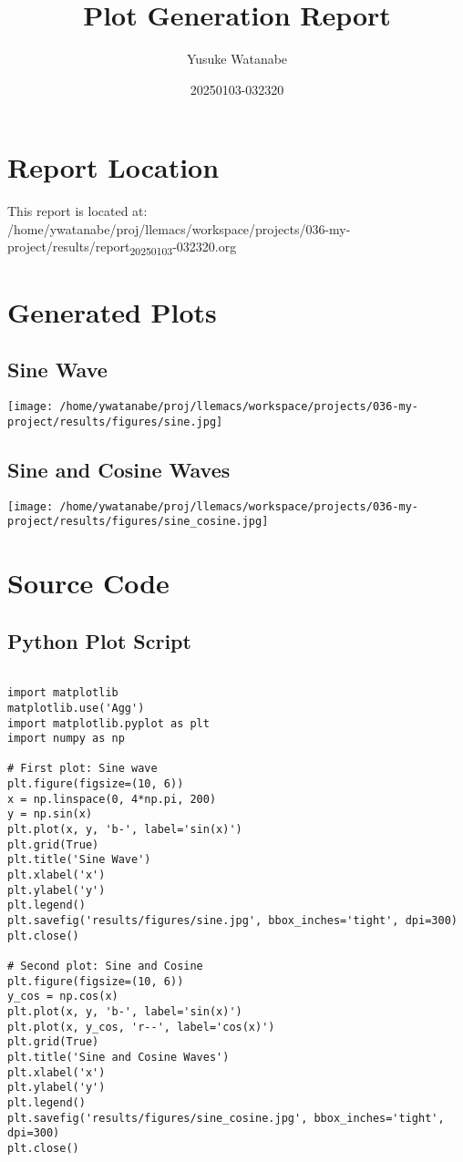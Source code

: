\documentclass[11pt]{article}
\author{Yusuke Watanabe}
\date{20250103-032320}
\title{Plot Generation Report}
\begin{document}
\maketitle
\tableofcontents


\section{Report Location}
\label{sec:orgd93d32f}
This report is located at: /home/ywatanabe/proj/llemacs/workspace/projects/036-my-project/results/report\textsubscript{20250103}-032320.org

\section{Generated Plots}
\label{sec:orgd9be403}

\subsection{Sine Wave}
\label{sec:org0f83f1f}
\begin{center}
\texttt{[image: /home/ywatanabe/proj/llemacs/workspace/projects/036-my-project/results/figures/sine.jpg]}
\end{center}

\subsection{Sine and Cosine Waves}
\label{sec:org4323faf}
\begin{center}
\texttt{[image: /home/ywatanabe/proj/llemacs/workspace/projects/036-my-project/results/figures/sine\_cosine.jpg]}
\end{center}

\section{Source Code}
\label{sec:org7a7e1e2}
\subsection{Python Plot Script}
\label{sec:org8edf7a5}
\begin{verbatim}

import matplotlib
matplotlib.use('Agg')
import matplotlib.pyplot as plt
import numpy as np

# First plot: Sine wave
plt.figure(figsize=(10, 6))
x = np.linspace(0, 4*np.pi, 200)
y = np.sin(x)
plt.plot(x, y, 'b-', label='sin(x)')
plt.grid(True)
plt.title('Sine Wave')
plt.xlabel('x')
plt.ylabel('y')
plt.legend()
plt.savefig('results/figures/sine.jpg', bbox_inches='tight', dpi=300)
plt.close()

# Second plot: Sine and Cosine
plt.figure(figsize=(10, 6))
y_cos = np.cos(x)
plt.plot(x, y, 'b-', label='sin(x)')
plt.plot(x, y_cos, 'r--', label='cos(x)')
plt.grid(True)
plt.title('Sine and Cosine Waves')
plt.xlabel('x')
plt.ylabel('y')
plt.legend()
plt.savefig('results/figures/sine_cosine.jpg', bbox_inches='tight', dpi=300)
plt.close()
\end{verbatim}
\end{document}
